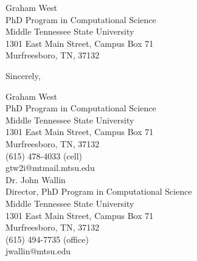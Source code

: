 \documentclass{letter}
\begin{document}
\begin{letter}{
Graham West \\
PhD Program in Computational Science \\
Middle Tennessee State University \\
1301 East Main Street, Campus Box 71 \\
Murfreesboro, TN, 37132
}
\closing{Sincerely,}


Graham West \\
PhD Program in Computational Science \\
Middle Tennessee State University \\
1301 East Main Street, Campus Box 71 \\
Murfreesboro, TN, 37132 \\
(615) 478-4033 (cell) \\
gtw2i@mtmail.mtsu.edu \\
\endminipage\hfill
{}
Dr. John Wallin \\
Director, PhD Program in Computational Science \\
Middle Tennessee State University \\
1301 East Main Street, Campus Box 71 \\
Murfreesboro, TN, 37132 \\
(615) 494-7735 (office) \\
jwallin@mtsu.edu \\
\endminipage\hfill



\end{letter}
\end{document}
